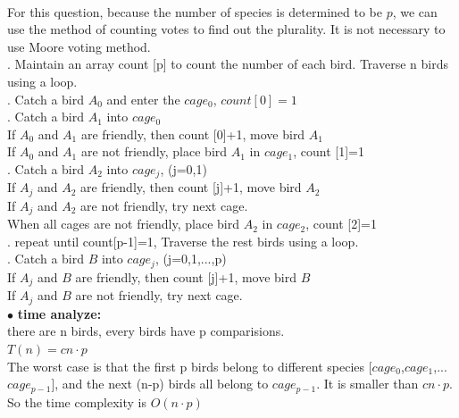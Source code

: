 \documentclass[12pt,a4paper]{article}
\newcommand{\question}[1]{\bigskip\noindent{\textbf{Q{#1} solution}}}
\begin{document}
\question{15.B}
\\ For this question, because the number of species is determined to be $p$, we can use the method of counting votes to find out the plurality. It is not necessary to use Moore voting method.\\

. Maintain an array count [p] to count the number of each bird. Traverse n birds using a loop.\\

. Catch a bird $A_0$ and enter the $cage_0$, $count[0]= 1$\\

. Catch a bird $A_1$ into $cage_0$
\\ If $A_0$ and $A_1$ are friendly, then count [0]+1, move bird $A_1$
\\ If $A_0$ and $A_1$ are not friendly, place bird $A_1$ in $cage_1$, count [1]=1\\

. Catch a bird $A_2$ into $cage_j$, (j=0,1)
\\ If $A_j$ and $A_2$ are friendly, then count [j]+1, move bird $A_2$
\\ If $A_j$ and $A_2$ are not friendly, try next cage.
\\ When all cages are not friendly, place bird $A_2$ in $cage_2$, count [2]=1\\

. repeat until count[p-1]=1, Traverse the rest birds using a loop.\\


. Catch a bird $B$ into $cage_j$, (j=0,1,...,p)
\\ If $A_j$ and $B$ are friendly, then count [j]+1, move bird $B$
\\ If $A_j$ and $B$ are not friendly, try next cage.\\

\noindent
$\bullet$ \textbf{time analyze:}
\\ there are n birds, every birds have p comparisions. 
\\ $T(n) = cn \cdot p$
\\ The worst case is that the first p birds belong to different species [$cage_0$,$cage_1$,...$cage_{p-1}$], and the next (n-p) birds all belong to $cage_{p-1}$. It is smaller than $cn \cdot p$.
\\ So the time complexity is $O(n \cdot p)$
\end{document}
